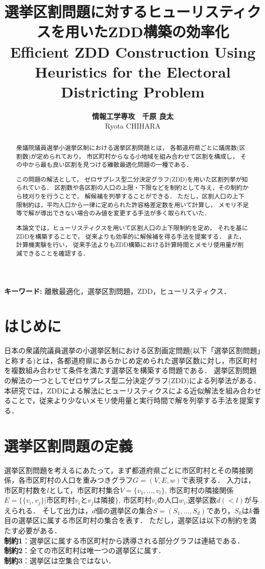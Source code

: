 \documentclass[10pt,a4paper,notitlepage,oneside,twocolumn]{abst_jsarticle}
\title{
{\bf 選挙区割問題に対するヒューリスティクスを用いたZDD構築の効率化}\\
{\sf Efficient ZDD Construction Using Heuristics for the Electoral Districting Problem}\\
}
\author{
{\large {\bf 情報工学専攻　千原 良太}}\\
{\large {\sf Ryota CHIHARA}}
}
\date{}
\begin{document}
\maketitle
\thispagestyle{firstpage}

\begin{abstract}
  衆議院議員選挙小選挙区制における選挙区割問題とは，
  各都道府県ごとに議席数(区割数)が定められており，
  市区町村からなる小地域を組み合わせて区割を構成し，
  その中から最も良い区割を見つける離散最適化問題の一種である．

  この問題の解法として，
  ゼロサプレス型二分決定グラフ(ZDD)を用いた区割列挙が知られている．
  区割数や各区割の人口の上限・下限などを制約として与え，その制約から枝刈りを行うことで，
  解候補を列挙することができる．
  ただし，区割人口の上下限制約は，平均人口から一律に定められた許容格差定数を用いて計算し，
  メモリ不足等で解が導出できない場合のみ値を変更する手法が多く取られていた．

  本論文では，ヒューリスティクスを用いて区割人口の上下限制約を定め，
  それを基にZDDを構築することで，
  従来よりも効率的に解候補を得る手法を提案する．
  また，計算機実験を行い，
  従来手法よりもZDD構築における計算時間とメモリ使用量が削減できることを確認する．
\end{abstract}


\vspace{1zw} \noindent
{\bf キーワード:}
離散最適化，選挙区割問題，ZDD，ヒューリスティクス．


\section{はじめに} \label{sec:section1}
日本の衆議院議員選挙の小選挙区制における区割画定問題(以下「選挙区割問題」と称する)とは，各都道府県にあらかじめ定められた選挙区数に対し，市区町村を複数組み合わせて条件を満たす選挙区を構築する問題である．
選挙区割問題の解法の一つとしてゼロサプレス型二分決定グラフ(ZDD)による列挙法\cite{kawahara}がある．
本研究では，ZDDによる解法にヒューリスティクスによる近似解法を組み合わせることで，従来より少ないメモリ使用量と実行時間で解を列挙する手法を提案する．

\section{選挙区割問題の定義} \label{sec:section2}
選挙区割問題を考えるにあたって，まず都道府県ごとに市区町村とその隣接関係，各市区町村の人口を重みつきグラフ$G=(V,E,w)$で表現する．
入力は，市区町村数を$l$として，市区町村集合$V=\{v_1,...,v_l\}$, 市区町村の隣接関係$E=\{\{v_i,v_j\}|$市区町村$v_i$と$v_j$は隣接$\}$, 市区町村$v_i$の人口$w_i$,選挙区数$d(<l)$が与えられる．
そして出力は，$d$個の選挙区の集合$S=(S_1,...,S_d)$であり，$S_k$は$k$番目の選挙区に属する市区町村の集合を表す．
ただし，選挙区は以下の制約を満たす必要がある．\\
\textbf{制約1}：選挙区に属する市区町村から誘導される部分グラフは連結である．\\
\textbf{制約2}：全ての市区町村は唯一つの選挙区に属す．\\
\textbf{制約3}：選挙区は空集合ではない．
\end{document}
